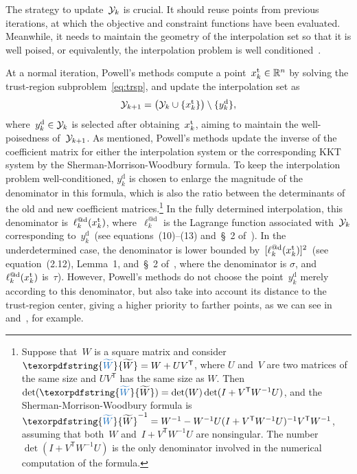 \documentclass[smallextended,final]{svjour3}
\newcommand{\set}[2][]{#1\{#2#1\}}
\newcommand{\R}{\mathbb{R}}
\newcommand{\T}{\mathsf{T}}
\newcommand{\drop}{{\text{d}}}
\newcommand{\trust}{{\text{t}}}
\newcommand{\iter}[1][k]{x\ifthenelse{\equal{#1}{}}{}{_{#1}}}
\newcommand{\xpt}[1][k]{\mathcal{Y}\ifthenelse{\equal{#1}{}}{}{_{#1}}}
\newcommand{\modified}[1]{\texorpdfstring{{\color{RoyalBlue}#1}}{#1}}
\begin{document}
The strategy to update~$\xpt$ is crucial.
It should reuse points from previous iterations, at which the objective and constraint functions have been evaluated.
Meanwhile, it needs to maintain the geometry of the interpolation set so that it is well poised, or equivalently, the interpolation problem is well conditioned~\cite{Conn_Scheinberg_Vicente_2009b}.

At a normal iteration, Powell's methods compute a point~$\iter^{\trust} \in \R^n$ by solving the trust-region subproblem~\eqref{eq:trsp}, and update the interpolation set as
\begin{equation}
    \label{eq:xpt-update-tr}
    \xpt[k + 1] = \big(\xpt \cup \set{\iter^{\trust}}\big) \setminus \set{y_k^{\drop}},
\end{equation}
where~$y_k^{\drop} \in \xpt$ is selected after obtaining~$\iter^{\trust}$, aiming to maintain the well-poisedness of~$\xpt[k + 1]$.
As mentioned, Powell's methods update the inverse of the coefficient matrix for either the interpolation system or the corresponding KKT system by the Sherman-Morrison-Woodbury formula.
To keep the interpolation problem well-conditioned, $y_k^{\drop}$ is chosen
to enlarge the magnitude of the denominator in this formula, which is also the ratio between the determinants of the old and new coefficient matrices.\footnote{
    Suppose that~$W$ is a square matrix and consider~$\modified{\widetilde{W}} = W + UV^\T$, where $U$ and~$V$ are two matrices of the same size and $UV^\T$ has the same size as $W$.
    Then $\det(\modified{\widetilde{W}}) = \det(W)\det(I+V^\T W^{-1}U)$, and the Sherman-Morrison-Woodbury formula is $\modified{\widetilde{W}}^{-1} = W^{-1} -W^{-1}U(I+V^\T W^{-1}U)^{-1} V^\T W^{-1}$, assuming that both~$W$ and~$I+V^\T W^{-1}U$ are nonsingular.
    The number~$\det(I+V^\T W^{-1}U)$ is the only denominator involved in the numerical computation of the formula.
}
In the fully determined interpolation, this denominator is~$\ell_k^{@\drop}(\iter^{\trust})$, where~$\ell_k^{@\drop}$ is the Lagrange function associated with~$\xpt$ corresponding to~$y_k^\drop$~(see equations~(10)--(13) and~\S~2 of~\cite{Powell_2001}).
In the underdetermined case, the denominator is lower bounded by~$[\ell_k^{@\drop}(\iter^{\trust})]^2$~(see equation~(2.12), Lemma~1, and~\S~2 of~\cite{Powell_2004c}, where the denominator is $\sigma$, and~$\ell_k^{@\drop}(\iter^{\trust})$ is~$\tau$).
However, Powell's methods do not choose the point~$y_k^\drop$ merely according to this denominator, but also take into account its distance to the trust-region center, giving a higher priority to farther points, as we can see in~\cite[Equation~(56)]{Powell_2002} and~\cite[Equations~(7.4)--(7.5)]{Powell_2006}, for example.
\end{document}
